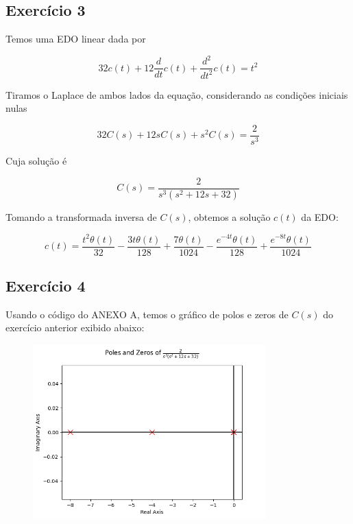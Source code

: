 \documentclass[12pt]{scrartcl}
\begin{document}
\subsection*{Exercício 3}

Temos uma EDO linear dada por

\[  32 c{\left(t \right)} + 12 \frac{d}{d t} c{\left(t \right)} + \frac{d^{2}}{d t^{2}} c{\left(t \right)} = t^2 \]

Tiramos o Laplace de ambos lados da equação, considerando as condições iniciais nulas

\[  32 C(s) + 12 s C(s) + s^2 C(s) = \frac{2}{s^3} \]

Cuja solução é  

\[ C(s) = \frac{2}{s^{3} \left(s^{2} + 12 s + 32\right)} \]

Tomando a transformada inversa de $C(s)$, obtemos a solução $c(t)$ da EDO:

\[ c(t) = \frac{t^{2} \theta\left(t\right)}{32} - \frac{3 t \theta\left(t\right)}{128} + \frac{7 \theta\left(t\right)}{1024} - \frac{e^{- 4 t} \theta\left(t\right)}{128} + \frac{e^{- 8 t} \theta\left(t\right)}{1024} \]

\subsection*{Exercício 4}

Usando o código do ANEXO A, temos o gráfico de polos e zeros de $C(s)$ do exercício 
anterior exibido abaixo:

\begin{figure}[h!]
	\begin{center}
    \includegraphics[width=0.8\textwidth,trim=1 1 1 1,clip]{ex4.png}
	\end{center}
\end{figure}
\end{document}
